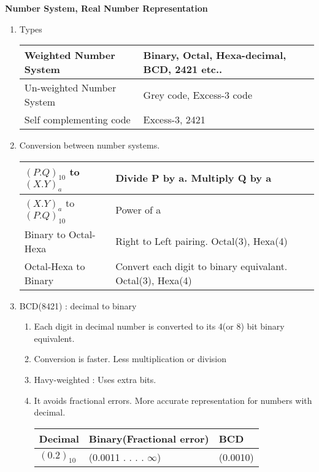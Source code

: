 
\centerline{\textbf{ \LARGE Number System, Real Number Representation}}

\begin{enumerate}
    \item Types \\
    \begin{myTableStyle} \begin{tabular}{ |m{5cm}|m{8cm}| } \hline
        Weighted Number System      &   Binary, Octal, Hexa-decimal, BCD, 2421 etc.. \\ \hline
        Un-weighted Number System   &   Grey code, Excess-3 code  \\ \hline
        Self complementing code     &   Excess-3, 2421\\ \hline
    \end{tabular} \end{myTableStyle} \vspace{0.08in}

    \item Conversion between number systems.\\
    \begin{myTableStyle} \begin{tabular}{ |m{5cm}|m{9cm}| } \hline
        { \Large \( (P.Q)_{10}\) to \( (X.Y)_a\) }      &   Divide P by a. Multiply Q by a \\ \hline
        { \Large \( (X.Y)_a\) to \( (P.Q)_{10}\) }      &   Power of a \\ \hline
        Binary to Octal-Hexa                            &   Right to Left pairing. Octal(3), Hexa(4) \\ \hline
        Octal-Hexa to Binary                            &   Convert each digit to binary equivalant. Octal(3), Hexa(4) \\ \hline
    \end{tabular} \end{myTableStyle} \vspace{0.08in}

    \item BCD(8421) : decimal to binary
    \begin{enumerate}
    \item Each digit in decimal number is converted to its 4(or 8) bit binary equivalent.
    \item Conversion is faster. Less multiplication or division
    \item Havy-weighted : Uses extra bits.
    \item It avoids fractional errors. More accurate representation for numbers with decimal.\\
    \begin{myTableStyle} \begin{tabular}{ |m{3cm}|m{4cm}|m{3cm}| } \hline
        Decimal                 & Binary(Fractional error)     & BCD       \\ \hline
        {\Large \((0.2)_{10}\)} & (0.0011 . . . . \(\infty\))   & (0.0010)  \\ \hline
    \end{tabular} \end{myTableStyle} \vspace{0.08in}


\end{enumerate}
\end{enumerate}
